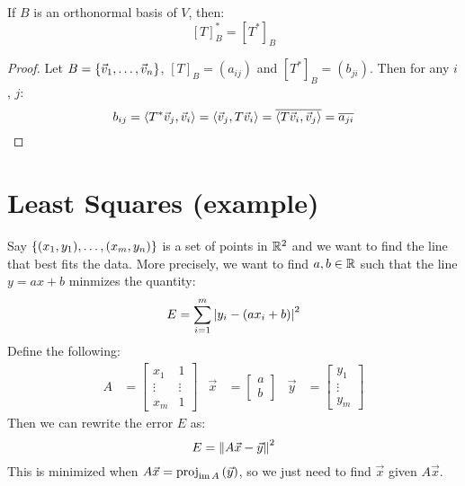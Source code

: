 \begin{theorem}\label{conjtradjequiv}
  If $B$ is an orthonormal basis of $V$, then:
    $$[T]_B^* = [T^*]_B$$
\end{theorem}
\begin{proof}
  Let $B = \setof{\vec v_1, \ldots, \vec v_n}$, $[T]_B = (a_{ij})$ and $[T^*]_B = (b_{ji})$.
  Then for any $i$, $j$:
  $$b_{ij} = \inp{T^* \vec v_j}{\vec v_i} = \inp{\vec v_j}{T \vec v_i} = \conj{\inp{T \vec v_i}{\vec v_j}} = \conj{a_{ji}}$$
\end{proof}

\section{Least Squares (example)}
Say $\setof{(x_1,y_1), \ldots, (x_m,y_n)}$ is a set of points in $\R^2$ and we want to find the line that best fits the data.
More precisely, we want to find $a, b \in \R$ such that the line $y = ax + b$ minmizes the quantity:
$$E = \sum_{i=1}^m\abs{y_i-(ax_i+b)}^2$$
Define the following:
\begin{align*}
  A &= \begin{bmatrix} x_1 & 1 \\ \vdots & \vdots \\ x_m & 1 \end{bmatrix} &
  \vec x &= \begin{bmatrix}a \\ b\end{bmatrix} &
  \vec y &= \begin{bmatrix}y_1 \\ \vdots \\ y_m\end{bmatrix}
\end{align*}
Then we can rewrite the error $E$ as:
  $$E = \norm{A\vec x - \vec y}^2$$
This is minimized when $A\vec x = \proj[\im A]{\vec y}$, so we just need to find $\vec x$ given $A\vec x$.

